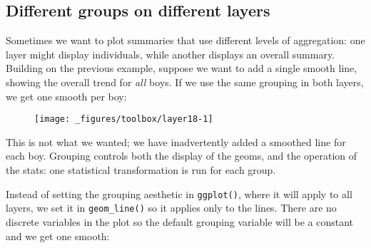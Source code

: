 \hypertarget{different-groups-on-different-layers}{%
\subsection{Different groups on different
layers}\label{different-groups-on-different-layers}}

Sometimes we want to plot summaries that use different levels of
aggregation: one layer might display individuals, while another displays
an overall summary. Building on the previous example, suppose we want to
add a single smooth line, showing the overall trend for \emph{all} boys.
If we use the same grouping in both layers, we get one smooth per boy:

\begin{Shaded}
\begin{Highlighting}[]
\OperatorTok{+}\StringTok{ }
\StringTok{  }\NormalTok{() }\OperatorTok{+}\StringTok{ }
\StringTok{  }\NormalTok{(} \NormalTok{, } \NormalTok{)}
\end{Highlighting}
\end{Shaded}

\begin{figure}[H]
  \centering
  \texttt{[image: \_figures/toolbox/layer18-1]}
\end{figure}

This is not what we wanted; we have inadvertently added a smoothed line
for each boy. Grouping controls both the display of the geoms, and the
operation of the stats: one statistical transformation is run for each
group.

Instead of setting the grouping aesthetic in \texttt{ggplot()}, where it
will apply to all layers, we set it in \texttt{geom\_line()} so it
applies only to the lines. There are no discrete variables in the plot
so the default grouping variable will be a constant and we get one
smooth:

\begin{Shaded}
\begin{Highlighting}[]
\OperatorTok{+}\StringTok{ }
\StringTok{  }\NormalTok{(}\NormalTok{(}\OperatorTok{+}\StringTok{ }
\StringTok{  }\NormalTok{(} \NormalTok{, } \NormalTok{, } \NormalTok{)}
\end{Highlighting}
\end{Shaded}

